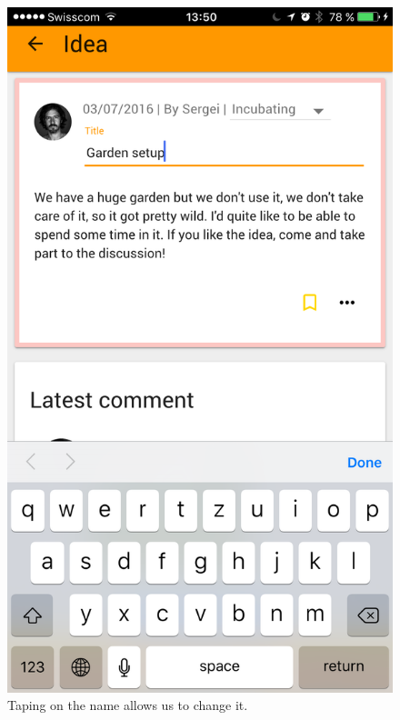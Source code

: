 \documentclass[a4paper,12pt,twoside]{article}
\begin{document}
\begin{figure}[!htb]
\begin{minipage}[t]{.32\textwidth}
        \includegraphics[width=\textwidth]{images/flow_updateIdeaName_2.png}
        \caption{Taping on the name allows us to change it.}
    \end{minipage}
    \hfill
    \begin{minipage}[t]{.32\textwidth}
        \centering

\end{minipage}
\end{figure}
\end{document}
